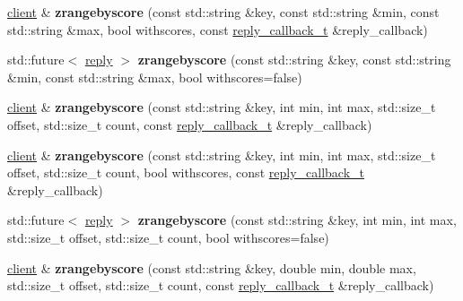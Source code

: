 \begin{DoxyCompactItemize}
\item 
\mbox{\label{classcpp__redis_1_1client_af77f35c0ebce2efd389753da281a5710}} 
\hyperlink{classcpp__redis_1_1client}{client} \& {\bfseries zrangebyscore} (const std\+::string \&key, const std\+::string \&min, const std\+::string \&max, bool withscores, const \hyperlink{classcpp__redis_1_1client_a061a1140d36d2eaeda82b09a0bb3f9f2}{reply\+\_\+callback\+\_\+t} \&reply\+\_\+callback)
\item 
\mbox{\label{classcpp__redis_1_1client_aab381eb8a022e9bd4b4fedab899330b3}} 
std\+::future$<$ \hyperlink{classcpp__redis_1_1reply}{reply} $>$ {\bfseries zrangebyscore} (const std\+::string \&key, const std\+::string \&min, const std\+::string \&max, bool withscores=false)
\item 
\mbox{\label{classcpp__redis_1_1client_a360894bd55d9d65582fb862cdccdfade}} 
\hyperlink{classcpp__redis_1_1client}{client} \& {\bfseries zrangebyscore} (const std\+::string \&key, int min, int max, std\+::size\+\_\+t offset, std\+::size\+\_\+t count, const \hyperlink{classcpp__redis_1_1client_a061a1140d36d2eaeda82b09a0bb3f9f2}{reply\+\_\+callback\+\_\+t} \&reply\+\_\+callback)
\item 
\mbox{\label{classcpp__redis_1_1client_a6dabde5a64f366e52b6ab108aef56975}} 
\hyperlink{classcpp__redis_1_1client}{client} \& {\bfseries zrangebyscore} (const std\+::string \&key, int min, int max, std\+::size\+\_\+t offset, std\+::size\+\_\+t count, bool withscores, const \hyperlink{classcpp__redis_1_1client_a061a1140d36d2eaeda82b09a0bb3f9f2}{reply\+\_\+callback\+\_\+t} \&reply\+\_\+callback)
\item 
\mbox{\label{classcpp__redis_1_1client_a6ebc52eccfc444fe11ad40063158e262}} 
std\+::future$<$ \hyperlink{classcpp__redis_1_1reply}{reply} $>$ {\bfseries zrangebyscore} (const std\+::string \&key, int min, int max, std\+::size\+\_\+t offset, std\+::size\+\_\+t count, bool withscores=false)
\item 
\mbox{\label{classcpp__redis_1_1client_a060e1c63341da72f678363fc7c9efa6b}} 
\hyperlink{classcpp__redis_1_1client}{client} \& {\bfseries zrangebyscore} (const std\+::string \&key, double min, double max, std\+::size\+\_\+t offset, std\+::size\+\_\+t count, const \hyperlink{classcpp__redis_1_1client_a061a1140d36d2eaeda82b09a0bb3f9f2}{reply\+\_\+callback\+\_\+t} \&reply\+\_\+callback)

\end{DoxyCompactItemize}
